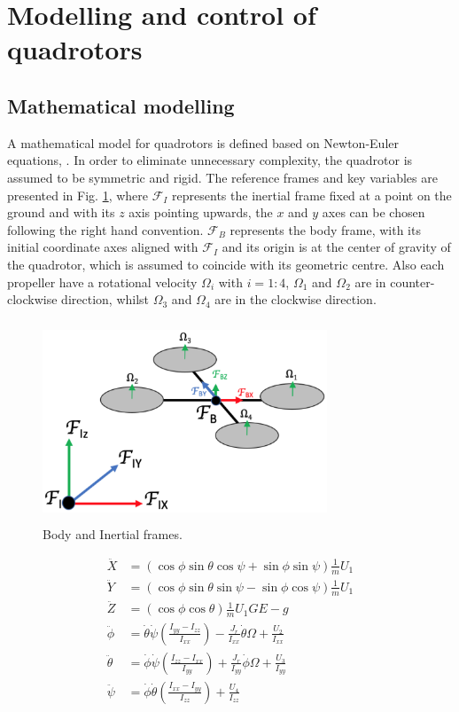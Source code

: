 \documentclass[conference]{IEEEtran}
\begin{document}
\section{Modelling and control of quadrotors}
\subsection{Mathematical modelling}
A mathematical model for quadrotors is defined based on Newton-Euler equations, \cite{DenaRuiz2017_1}. In order to eliminate unnecessary complexity, the quadrotor is assumed to be symmetric and rigid. The reference frames and key variables are presented in Fig. \ref{quad_frames}, where $\mathcal{F}_{I}$ represents the inertial frame fixed at a point on the ground and with its $z$ axis pointing upwards, the $x$ and $y$ axes can be chosen following the right hand convention. $\mathcal{F}_{B}$ represents the body frame, with its initial coordinate axes aligned with $\mathcal{F}_{I}$ and its origin is at the center of gravity of the quadrotor, which is assumed to coincide with its geometric centre. Also each propeller have a rotational velocity $\Omega_{i}$ with $i=1:4$, $\Omega_{1}$ and $\Omega_{2}$ are in counter-clockwise direction, whilst $\Omega_{3}$ and $\Omega_{4}$ are in the clockwise direction.

\begin{figure}
    \centering
    \includegraphics[width=8.5cm, height=6cm]{Images/quad_frames.eps}
    \caption{Body and Inertial frames.}
    \label{quad_frames}
\end{figure}


\begin{align}
    \ddot{X}      &= (\cos\phi\sin\theta\cos\psi + \sin\phi\sin\psi)\frac{1}{m}U_{1} \label{model_1}\\
    \ddot{Y}      &= (\cos\phi\sin\theta\sin\psi - \sin\phi\cos\psi)\frac{1}{m}U_{1}  \label{model_2}\\
    \ddot{Z}      &= (\cos\phi\cos\theta)\frac{1}{m}U_{1}GE - g \label{model_3}\\ 
    \ddot{\phi}   &= \dot{\theta}\dot{\psi}(\frac{I_{yy}-I_{zz}}{I_{xx}})-\frac{J_{r}}{I_{xx}}\dot{\theta}\Omega+\frac{U_{2}}{I_{xx}} \label{model_4}\\
    \ddot{\theta} &= \dot{\phi}\dot{\psi}(\frac{I_{zz}-I_{xx}}{I_{yy}})+\frac{J_{r}}{I_{yy}}\dot{\phi}\Omega+\frac{U_{3}}{I_{yy}} \label{model_5}\\
    \ddot{\psi}   &= \dot{\phi}\dot{\theta}(\frac{I_{xx}-I_{yy}}{I_{zz}})+\frac{U_{4}}{I_{zz}} \label{model_6}
\end{align}
\end{document}
